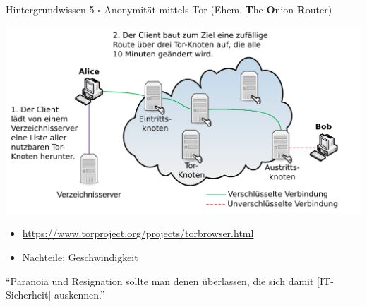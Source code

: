 \documentclass{beamer}
\begin{document}
\begin{frame}[label=bg5]{Hintergrundwissen 5}
$\square$ Anonymität mittels Tor (Ehem. \textbf{T}he \textbf{O}nion \textbf{R}outer)

\begin{center}
\includegraphics[width=0.6\columnwidth]{img-src/TOR_Arbeitsweise}
\end{center}

\pause 
\begin{itemize}
\item {\small \url{https://www.torproject.org/projects/torbrowser.html}}
\item Nachteile: Geschwindigkeit
\end{itemize}
\end{frame}





\begin{frame}[label=wb]

\begin{center}
 \vspace{10mm}
{\Huge  "`Paranoia und Resignation sollte man denen überlassen, die sich damit [IT-Sicherheit] auskennen."'}
\end{center}
 
\end{frame}
\end{document}
